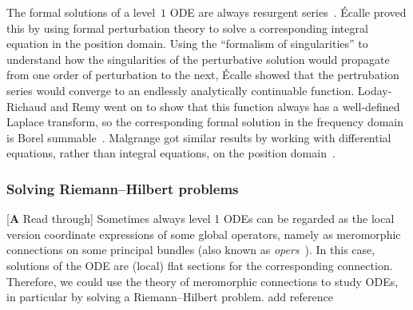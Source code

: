 \documentclass{article}
\theoremstyle{definition}
\theoremstyle{plain}
\newenvironment{todo}{\color{Coral}}{\color{black}}
\newenvironment{old}{\color{RoyalBlue}}{\color{black}}
\newenvironment{draft}{\color{SlateBlue}}{\color{black}}
\begin{document}
The formal solutions of a level~$1$ ODE are always resurgent series~\cite[Proposition~2.2.1]{EcalleIII}. \'{E}calle proved this by using formal perturbation theory to solve a corresponding integral equation in the position domain. Using the ``formalism of singularities'' to understand how the singularities of the perturbative solution would propagate from one order of perturbation to the next, \'{E}calle showed that the pertrubation series would converge to an endlessly analytically continuable function. Loday-Richaud and Remy went on to show that this function always has a well-defined Laplace transform, so the corresponding formal solution in the frequency domain is Borel summable~\cite{loday-Remy2011}. Malgrange got similar results by working with differential equations, rather than integral equations, on the position domain~\cite{malgrange--fourier}.





\subsubsection{Solving Riemann--Hilbert problems}
\begin{todo}[\textbf{A} Read through]\end{todo} \begin{old}Sometimes\end{old} \begin{draft}always\end{draft} level 1 ODEs can be regarded as the \begin{old}local version\end{old} \begin{draft}coordinate expressions\end{draft} of some global operators, namely as meromorphic connections on some principal bundles (also known as \textit{opers}~\cite{BD-opers}). In this case, solutions of the ODE are (local) flat sections for the corresponding connection. Therefore, we could use the theory of meromorphic connections to study ODEs, in particular by solving a Riemann--Hilbert problem. \begin{todo}
    add reference
\end{todo}
\end{document}
